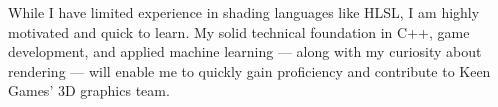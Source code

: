 While I have limited experience in shading languages like HLSL,
I am highly motivated and quick to learn. 
My solid technical foundation in C++, game development, and applied machine learning — 
along with my curiosity about rendering — will enable me to quickly gain
 proficiency and contribute to Keen Games' 3D graphics team.